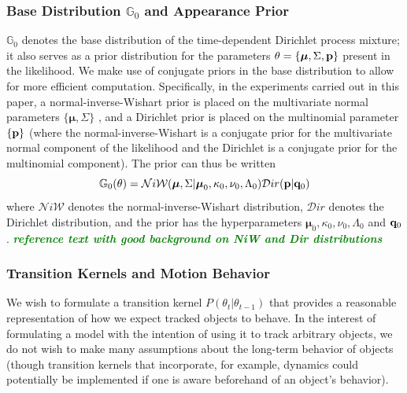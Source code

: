 \documentclass[smallcondensed, final]{svjour3}
\newcommand{\willie}[1]{\textcolor{green}{\textsf{\emph{\textbf{\textcolor{green}{#1}}}}}}
\begin{document}
\subsubsection{Base Distribution $\mathbb{G}_{0}$ and Appearance Prior}

$\mathbb{G}_{0}$ denotes the base distribution of the time-dependent Dirichlet process mixture; it also serves as a prior distribution for the parameters $\theta = \{ \boldsymbol{\mu}, \Sigma, \bold{p} \}$ present in the likelihood. We make use of conjugate priors in the base distribution to allow for more efficient computation. Specifically, in the experiments carried out in this paper, a normal-inverse-Wishart prior is placed on the multivariate normal parameters $\{ \boldsymbol{\mu}, \Sigma \}$ , and a Dirichlet prior is placed on the multinomial parameter $ \{  \bold{p}  \} $ (where the normal-inverse-Wishart is a conjugate prior for the multivariate normal component of the likelihood and the Dirichlet is a conjugate prior for the multinomial component). The prior can thus be written
\begin{equation} \label{basedistro}
\mathbb{G}_{0}(\theta) = \mathcal{N}i\mathcal{W}(\boldsymbol{\mu}, \Sigma | \boldsymbol{\mu}_{0}, \kappa_{0}, \nu_{0}, \Lambda_{0})  \mathcal{D}ir( \bold{p} | \bold{q}_{0})
\end{equation}
where $\mathcal{N}i\mathcal{W}$ denotes the normal-inverse-Wishart distribution, $\mathcal{D}ir$ denotes the Dirichlet distribution, and the prior has the hyperparameters $\boldsymbol{\mu}_{0}, \kappa_{0}, \nu_{0}, \Lambda_{0}$ and $\bold{q}_{0}$.  \willie{reference text with good background on NiW and Dir distributions}



\subsubsection{Transition Kernels and Motion Behavior}

We wish to formulate a transition kernel $P(\theta_{t} | \theta_{t-1})$ that provides a reasonable representation of how we expect tracked objects to behave. In the interest of formulating a model with the intention of using it to track arbitrary objects, we do not wish to make many assumptions about the long-term behavior of objects (though transition kernels that incorporate, for example, dynamics could potentially be implemented if one is aware beforehand of an object's behavior).
\end{document}
